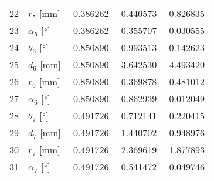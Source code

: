 \documentclass{standalone}%
\begin{document}
\begin{tabular}{llrrr}
22 &              $r_{5}$ [mm] &  0.386262 &  -0.440573 &  -0.826835 \\
23 &  $\alpha_{5}$ [$\degree$] &  0.386262 &   0.355707 &  -0.030555 \\
24 &  $\theta_{6}$ [$\degree$] & -0.850890 &  -0.993513 &  -0.142623 \\
25 &              $d_{6}$ [mm] & -0.850890 &   3.642530 &   4.493420 \\
26 &              $r_{6}$ [mm] & -0.850890 &  -0.369878 &   0.481012 \\
27 &  $\alpha_{6}$ [$\degree$] & -0.850890 &  -0.862939 &  -0.012049 \\
28 &  $\theta_{7}$ [$\degree$] &  0.491726 &   0.712141 &   0.220415 \\
29 &              $d_{7}$ [mm] &  0.491726 &   1.440702 &   0.948976 \\
30 &              $r_{7}$ [mm] &  0.491726 &   2.369619 &   1.877893 \\
31 &  $\alpha_{7}$ [$\degree$] &  0.491726 &   0.541472 &   0.049746 \\
\bottomrule
\end{tabular}
%
\end{document}
